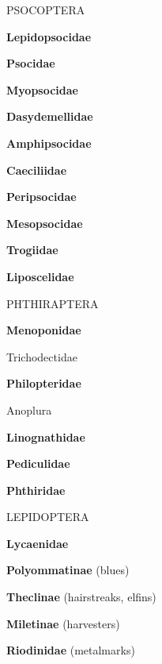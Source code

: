 \documentclass[letterpaper,10pt]{article}
\begin{document}
{%
%
%
\makebox[0.0cm]{}  PSOCOPTERA \par
\makebox[0.6cm]{}  \textbf{Lepidopsocidae} \par
\makebox[0.6cm]{}  \textbf{Psocidae} \par
\makebox[0.6cm]{}  \textbf{Myopsocidae} \par
\makebox[0.6cm]{}  \textbf{Dasydemellidae} \par
\makebox[0.6cm]{}  \textbf{Amphipsocidae} \par
\makebox[0.6cm]{}  \textbf{Caeciliidae} \par
\makebox[0.6cm]{}  \textbf{Peripsocidae} \par
\makebox[0.6cm]{}  \textbf{Mesopsocidae} \par
\makebox[0.6cm]{}  \textbf{Trogiidae} \par
\makebox[0.6cm]{}  \textbf{Liposcelidae} \par
%
%
%
\makebox[0.0cm]{}  PHTHIRAPTERA \par
\makebox[0.6cm]{}  \textbf{Menoponidae} \par
\makebox[0.20cm]{}  Trichodectidae \par
\makebox[0.6cm]{}  \textbf{Philopteridae} \par
\makebox[0.20cm]{} Anoplura \par
\makebox[0.6cm]{}  \textbf{Linognathidae} \par
\makebox[0.6cm]{}  \textbf{Pediculidae} \par
\makebox[0.6cm]{}  \textbf{Phthiridae} \par
%
%
%
\makebox[0.0cm]{}  LEPIDOPTERA\par
\makebox[0.6cm]{}  \textbf{Lycaenidae} \par
\makebox[0.8cm]{}  \textbf{Polyommatinae} (blues) \par
\makebox[0.8cm]{}  \textbf{Theclinae} (hairstreaks, elfins) \par
\makebox[0.8cm]{}  \textbf{Miletinae} (harvesters) \par
\makebox[0.6cm]{}  \textbf{Riodinidae} (metalmarks) \par
}
\end{document}
